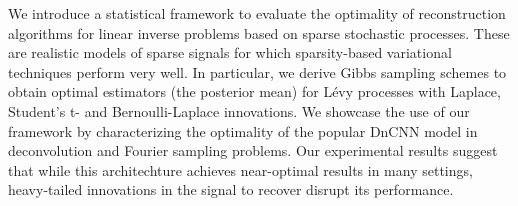 We introduce a statistical framework to evaluate the optimality
of reconstruction algorithms for linear inverse problems based
on sparse stochastic processes. These are realistic models
of sparse signals for which sparsity-based variational
techniques perform very well. In particular, we derive Gibbs
sampling schemes to obtain optimal estimators (the posterior
mean) for L\'{e}vy processes with Laplace, Student's t- and
Bernoulli-Laplace innovations. We showcase the use of our
framework by characterizing the optimality of the popular
DnCNN model in deconvolution and Fourier sampling problems.
Our experimental results suggest that while this architechture
achieves near-optimal results in many settings, heavy-tailed
innovations in the signal to recover disrupt its performance.
